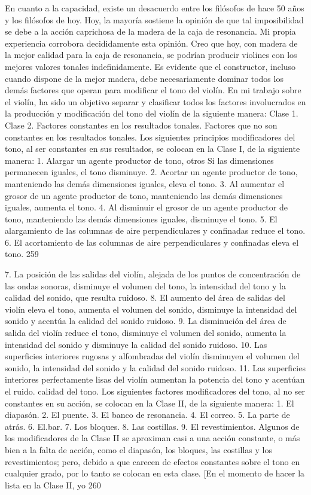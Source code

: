 En cuanto a la capacidad, existe un desacuerdo entre los filósofos de hace 50 años y los filósofos de hoy. Hoy, la mayoría sostiene la opinión de que tal imposibilidad se debe a la acción caprichosa de la madera de la caja de resonancia. Mi propia experiencia corrobora decididamente esta opinión. Creo que hoy, con madera de la mejor calidad para la caja de resonancia, se podrían producir violines con los mejores valores tonales indefinidamente. Es evidente que el constructor, incluso cuando dispone de la mejor madera, debe necesariamente dominar todos los demás factores que operan para modificar el tono del violín. En mi trabajo sobre el violín, ha sido un objetivo separar y clasificar todos los factores involucrados en la
producción y modificación del tono del violín de la siguiente manera:
Clase 1. Clase 2.	Factores constantes en los resultados tonales. Factores que no son constantes en los resultados tonales.
Los siguientes principios modificadores del tono, al ser constantes en sus resultados, se colocan en la Clase I, de la siguiente manera:	
1.	Alargar un agente productor de tono, otros
Si las dimensiones permanecen iguales, el tono disminuye.
2. Acortar un agente productor de tono, manteniendo las demás dimensiones iguales, eleva el tono.
3. Al aumentar el grosor de un agente productor de tono, manteniendo las demás dimensiones iguales, aumenta el tono.
4. Al disminuir el grosor de un agente productor de tono, manteniendo las demás dimensiones iguales, disminuye el tono.
5. El alargamiento de las columnas de aire perpendiculares y confinadas reduce el tono.
6. El acortamiento de las columnas de aire perpendiculares y confinadas eleva el tono.
259

7. La posición de las salidas del violín, alejada de los puntos de concentración de las ondas sonoras, disminuye el volumen del tono, la intensidad del tono y la calidad del sonido, que resulta ruidoso.
8. El aumento del área de salidas del violín eleva el tono, aumenta el volumen del sonido, disminuye la intensidad del sonido y acentúa la calidad del sonido ruidoso.
9. La disminución del área de salida del violín reduce el tono, disminuye el volumen del sonido, aumenta la intensidad del sonido y disminuye la calidad del sonido ruidoso.
10. Las superficies interiores rugosas y alfombradas del violín disminuyen el volumen del sonido, la intensidad del sonido y la calidad del sonido ruidoso.
11. Las superficies interiores perfectamente lisas del violín aumentan la potencia del tono y acentúan el ruido.
calidad del tono.
Los siguientes factores modificadores del tono, al no ser constantes en su acción, se colocan en la Clase II, de la siguiente manera:
1. El diapasón.
2. El puente.
3. El banco de resonancia.
4. El
correo.
5. La parte de atrás.
6. El.bar.
7. Los bloques.
8. Las costillas.
9. El
revestimientos.
Algunos de los modificadores de la Clase II se aproximan casi a una acción constante, o más bien a la falta de acción, como el diapasón, los bloques, las costillas y los revestimientos; pero, debido a que carecen de efectos constantes sobre el tono en cualquier grado, por lo tanto se colocan en esta clase. [En
el momento de hacer la lista en la Clase II, yo
260

